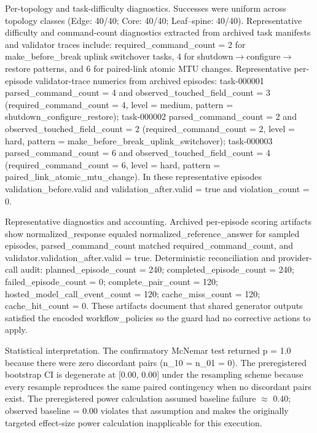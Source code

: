 \documentclass[conference]{IEEEtran}
\begin{document}
Per-topology and task-difficulty diagnostics. Successes were uniform across topology classes (Edge: 40/40; Core: 40/40; Leaf--spine: 40/40). Representative difficulty and command-count diagnostics extracted from archived task manifests and validator traces include: required\_command\_count = 2 for make\_before\_break uplink switchover tasks, 4 for shutdown\ensuremath{\rightarrow}configure\ensuremath{\rightarrow}restore patterns, and 6 for paired-link atomic MTU changes. Representative per-episode validator-trace numerics from archived episodes: task-000001 parsed\_command\_count = 4 and observed\_touched\_field\_count = 3 (required\_command\_count = 4, level = medium, pattern = shutdown\_configure\_restore); task-000002 parsed\_command\_count = 2 and observed\_touched\_field\_count = 2 (required\_command\_count = 2, level = hard, pattern = make\_before\_break\_uplink\_switchover); task-000003 parsed\_command\_count = 6 and observed\_touched\_field\_count = 4 (required\_command\_count = 6, level = hard, pattern = paired\_link\_atomic\_mtu\_change). In these representative episodes validation\_before.valid and validation\_after.valid = true and violation\_count = 0.

Representative diagnostics and accounting. Archived per-episode scoring artifacts show normalized\_response equaled normalized\_reference\_answer for sampled episodes, parsed\_command\_count matched required\_command\_count, and validator.validation\_after.valid = true. Deterministic reconciliation and provider-call audit: planned\_episode\_count = 240; completed\_episode\_count = 240; failed\_episode\_count = 0; complete\_pair\_count = 120; hosted\_model\_call\_event\_count = 120; cache\_miss\_count = 120; cache\_hit\_count = 0. These artifacts document that shared generator outputs satisfied the encoded workflow\_policies so the guard had no corrective actions to apply.

Statistical interpretation. The confirmatory McNemar test returned p = 1.0 because there were zero discordant pairs (n\_10 = n\_01 = 0). The preregistered bootstrap CI is degenerate at [0.00, 0.00] under the resampling scheme because every resample reproduces the same paired contingency when no discordant pairs exist. The preregistered power calculation assumed baseline failure \ensuremath{\approx} 0.40; observed baseline = 0.00 violates that assumption and makes the originally targeted effect-size power calculation inapplicable for this execution.
\end{document}
